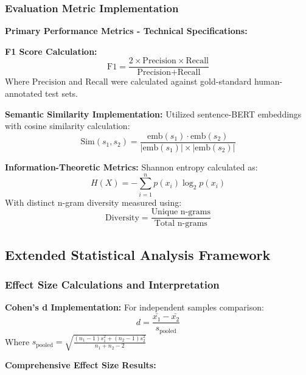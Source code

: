 \documentclass{article}
\begin{document}
\subsubsection{Evaluation Metric Implementation}

\textbf{Primary Performance Metrics - Technical Specifications:}

\textbf{F1 Score Calculation:}
\begin{equation}
\text{F1} = \frac{2 \times \text{Precision} \times \text{Recall}}{\text{Precision} + \text{Recall}}
\end{equation}
Where $\text{Precision}$ and $\text{Recall}$ were calculated against gold-standard human-annotated test sets.

\textbf{Semantic Similarity Implementation:}
Utilized sentence-BERT embeddings with cosine similarity calculation:
\begin{equation}
\text{Sim}(s_1, s_2) = \frac{\text{emb}(s_1) \cdot \text{emb}(s_2)}{|\text{emb}(s_1)| \times |\text{emb}(s_2)|}
\end{equation}

\textbf{Information-Theoretic Metrics:}
Shannon entropy calculated as:
\begin{equation}
H(X) = -\sum_{i=1}^{n} p(x_i) \log_2 p(x_i)
\end{equation}
With distinct n-gram diversity measured using:
\begin{equation}
\text{Diversity} = \frac{\text{Unique n-grams}}{\text{Total n-grams}}
\end{equation}

\subsection{Extended Statistical Analysis Framework}
\label{appendix:statistical_methods}

\subsubsection{Effect Size Calculations and Interpretation}

\textbf{Cohen's d Implementation:}
For independent samples comparison:
\begin{equation}
d = \frac{\bar{x_1} - \bar{x_2}}{s_{\text{pooled}}}
\end{equation}
Where $s_{\text{pooled}} = \sqrt{\frac{(n_1-1)s_1^2 + (n_2-1)s_2^2}{n_1 + n_2 - 2}}$

\textbf{Comprehensive Effect Size Results:}
\end{document}
